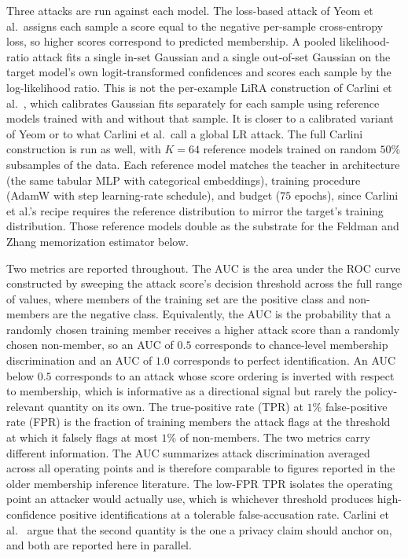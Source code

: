 \documentclass[conference]{IEEEtran}
\begin{document}
Three attacks are run against each model. The loss-based attack of Yeom et al.\ assigns each sample a score equal to the negative per-sample cross-entropy loss, so higher scores correspond to predicted membership. A pooled likelihood-ratio attack fits a single in-set Gaussian and a single out-of-set Gaussian on the target model's own logit-transformed confidences and scores each sample by the log-likelihood ratio. This is not the per-example LiRA construction of Carlini et al.~\cite{carlini2022}, which calibrates Gaussian fits separately for each sample using reference models trained with and without that sample. It is closer to a calibrated variant of Yeom or to what Carlini et al.\ call a global LR attack. The full Carlini construction is run as well, with $K = 64$ reference models trained on random $50\%$ subsamples of the data. Each reference model matches the teacher in architecture (the same tabular MLP with categorical embeddings), training procedure (AdamW with step learning-rate schedule), and budget ($75$ epochs), since Carlini et al.'s recipe requires the reference distribution to mirror the target's training distribution. Those reference models double as the substrate for the Feldman and Zhang memorization estimator below.

Two metrics are reported throughout. The AUC is the area under the ROC curve constructed by sweeping the attack score's decision threshold across the full range of values, where members of the training set are the positive class and non-members are the negative class. Equivalently, the AUC is the probability that a randomly chosen training member receives a higher attack score than a randomly chosen non-member, so an AUC of $0.5$ corresponds to chance-level membership discrimination and an AUC of $1.0$ corresponds to perfect identification. An AUC below $0.5$ corresponds to an attack whose score ordering is inverted with respect to membership, which is informative as a directional signal but rarely the policy-relevant quantity on its own. The true-positive rate (TPR) at $1\%$ false-positive rate (FPR) is the fraction of training members the attack flags at the threshold at which it falsely flags at most $1\%$ of non-members. The two metrics carry different information. The AUC summarizes attack discrimination averaged across all operating points and is therefore comparable to figures reported in the older membership inference literature. The low-FPR TPR isolates the operating point an attacker would actually use, which is whichever threshold produces high-confidence positive identifications at a tolerable false-accusation rate. Carlini et al.~\cite{carlini2022} argue that the second quantity is the one a privacy claim should anchor on, and both are reported here in parallel.
\end{document}
